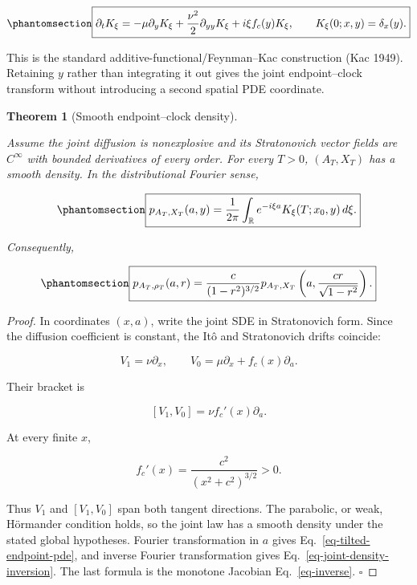 \documentclass[
  english,
  11pt,
  letterpaper,
  DIV=11,
  numbers=noendperiod]{scrartcl}
\newcounter{none} %
\theoremstyle{plain}
\newtheorem{theorem}{Theorem}[section]
\theoremstyle{plain}
\theoremstyle{plain}
\theoremstyle{plain}
\theoremstyle{remark}
\begin{document}
\begin{equation}\protect\phantomsection\label{eq-tilted-endpoint-pde}{
\boxed{
\partial_tK_\xi
=-\mu\partial_yK_\xi
+\frac{\nu^2}{2}\partial_{yy}K_\xi
+i\xi f_c(y)K_\xi,
\qquad
K_\xi(0;x,y)=\delta_x(y).
}
}\end{equation}

This is the standard additive-functional/Feynman--Kac construction (Kac
1949). Retaining \(y\) rather than integrating it out gives the joint
endpoint--clock transform without introducing a second spatial PDE
coordinate.

\begin{theorem}[Smooth endpoint--clock
density]\protect\hypertarget{thm-endpoint-clock}{}\label{thm-endpoint-clock}

Assume the joint diffusion is nonexplosive and its Stratonovich vector
fields are \(C^\infty\) with bounded derivatives of every order. For
every \(T>0\), \((A_T,X_T)\) has a smooth density. In the distributional
Fourier sense,

\begin{equation}\protect\phantomsection\label{eq-joint-density-inversion}{
\boxed{
p_{A_T,X_T}(a,y)
=\frac1{2\pi}
\int_{\mathbb R}
e^{-i\xi a}
K_\xi(T;x_0,y)\,d\xi.
}
}\end{equation}

Consequently,

\begin{equation}\protect\phantomsection\label{eq-clock-rho-density}{
\boxed{
p_{A_T,\rho_T}(a,r)
=\frac{c}{(1-r^2)^{3/2}}
p_{A_T,X_T}
\left(
a,\frac{cr}{\sqrt{1-r^2}}
\right).
}
}\end{equation}

\end{theorem}

\begin{proof}
In coordinates \((x,a)\), write the joint SDE in Stratonovich form.
Since the diffusion coefficient is constant, the Itô and Stratonovich
drifts coincide:

\[
V_1=\nu\partial_x,
\qquad
V_0=\mu\partial_x+f_c(x)\partial_a.
\]

Their bracket is

\[
[V_1,V_0]
=\nu f_c'(x)\partial_a.
\]

At every finite \(x\),

\[
f_c'(x)
=\frac{c^2}{(x^2+c^2)^{3/2}}>0.
\]

Thus \(V_1\) and \([V_1,V_0]\) span both tangent directions. The
parabolic, or weak, Hörmander condition holds, so the joint law has a
smooth density under the stated global hypotheses. Fourier
transformation in \(a\) gives Eq.~\ref{eq-tilted-endpoint-pde}, and
inverse Fourier transformation gives
Eq.~\ref{eq-joint-density-inversion}. The last formula is the monotone
Jacobian Eq.~\ref{eq-inverse}. \(\square\)
\end{proof}
\end{document}
